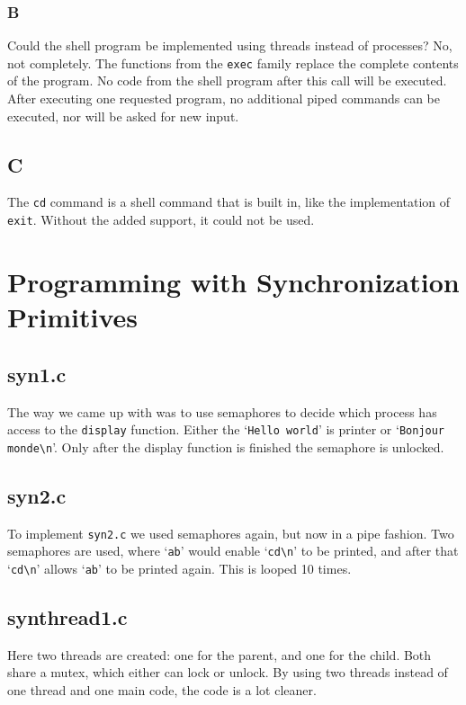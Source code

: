 \documentclass[11pt]{article}
\begin{document}
\subsubsection{B}

Could the shell program be implemented using threads instead of processes? No, not completely. The functions from the \texttt{exec} family replace the complete contents of the program. No code from the shell program after this call will be executed. After executing one requested program, no additional piped commands can be executed, nor will be asked for new input.

\subsection{C}

The \texttt{cd} command is a shell command that is built in, like the implementation of \texttt{exit}. Without the added support, it could not be used.

\section{Programming with Synchronization Primitives}
\subsection{syn1.c}

The way we came up with was to use semaphores to decide which process has access to the \texttt{display} function. Either the `\texttt{Hello world}' is printer or `\texttt{Bonjour monde\textbackslash{}n}'. Only after the display function is finished the semaphore is unlocked.

\subsection{syn2.c}
To implement \texttt{syn2.c} we used semaphores again, but now in a pipe fashion. Two semaphores are used, where `\texttt{ab}' would enable `\texttt{cd\textbackslash{}n}' to be printed, and after that `\texttt{cd\textbackslash{}n}' allows `\texttt{ab}' to be printed again. This is looped 10 times.

\subsection{synthread1.c}
Here two threads are created: one for the parent, and one for the child. Both share a mutex, which either can lock or unlock. By using two threads instead of one thread and one main code, the code is a lot cleaner.
\end{document}
